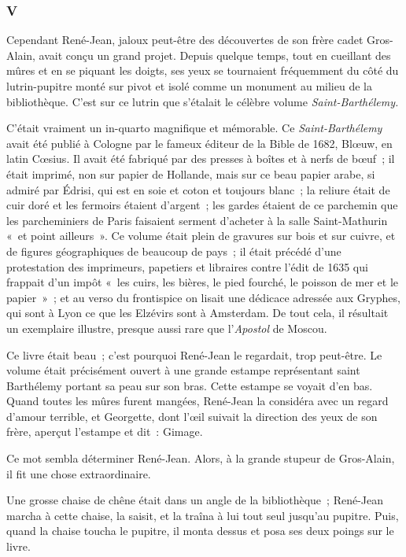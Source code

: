 \documentclass[french,twoside]{book} %
\begin{document}
\subsubsection[{V}]{V}
\label{p3l3c5}
\noindent Cependant René-Jean, jaloux peut-être des découvertes de son frère cadet Gros-Alain, avait conçu un grand projet. Depuis quelque temps, tout en cueillant des mûres et en se piquant les doigts, ses yeux se tournaient fréquemment du côté du lutrin-pupitre monté sur pivot et isolé comme un monument au milieu de la bibliothèque. C’est sur ce lutrin que s’étalait le célèbre volume \emph{Saint-Barthélemy.}\par
C’était vraiment un in-quarto magnifique et mémorable. Ce \emph{Saint-Barthélemy} avait été publié à Cologne par le fameux éditeur de la Bible de 1682, Blœuw, en latin Cœsius. Il avait été fabriqué par des presses à boîtes et à nerfs de bœuf ; il était imprimé, non sur papier de Hollande, mais sur ce beau papier arabe, si admiré par Édrisi, qui est en soie et coton et toujours blanc ; la reliure était de cuir doré et les fermoirs  étaient d’argent ; les gardes étaient de ce parchemin que les parcheminiers de Paris faisaient serment d’acheter à la salle Saint-Mathurin « et point ailleurs ». Ce volume était plein de gravures sur bois et sur cuivre, et de figures géographiques de beaucoup de pays ; il était précédé d’une protestation des imprimeurs, papetiers et libraires contre l’édit de 1635 qui frappait d’un impôt « les cuirs, les bières, le pied fourché, le poisson de mer et le papier » ; et au verso du frontispice on lisait une dédicace adressée aux Gryphes, qui sont à Lyon ce que les Elzévirs sont à Amsterdam. De tout cela, il résultait un exemplaire illustre, presque aussi rare que l’\emph{Apostol} de Moscou.\par
Ce livre était beau ; c’est pourquoi René-Jean le regardait, trop peut-être. Le volume était précisément ouvert à une grande estampe représentant saint Barthélemy portant sa peau sur son bras. Cette estampe se voyait d’en bas. Quand toutes les mûres furent mangées, René-Jean la considéra avec un regard d’amour terrible, et Georgette, dont l’œil suivait la direction des yeux de son frère, aperçut l’estampe et dit : Gimage.\par
Ce mot sembla déterminer René-Jean. Alors, à la grande stupeur de Gros-Alain, il fit une chose extraordinaire.\par
Une grosse chaise de chêne était dans un angle de la bibliothèque ; René-Jean marcha à cette chaise, la saisit, et la traîna à lui tout seul jusqu’au pupitre. Puis, quand la chaise toucha le pupitre, il monta dessus et posa ses deux poings sur le livre.\par
\end{document}
